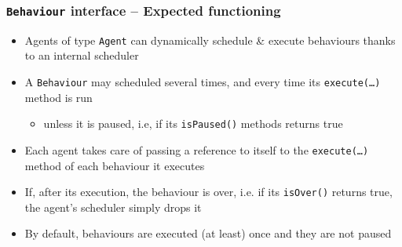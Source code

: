 \documentclass[presentation]{beamer}\mode<presentation>{\usetheme{AMSCesenaPurpleAndGold}}
\begin{document}
\begin{frame}%
    \frametitle{\texttt{Behaviour} interface -- Expected functioning}

    \begin{itemize}
        \item Agents of type \texttt{Agent} can dynamically \alert{schedule \& execute} behaviours thanks to an \alert{internal scheduler}

        \vfill

        \item A \texttt{Behaviour} may scheduled several times, and every time its \alert{\texttt{execute(\ldots)}} method is run
        \begin{itemize}
            \item unless it is \alert{paused}, i.e, if its \texttt{\alert{isPaused()}} methods returns true
        \end{itemize}

        \vfill

        \item Each agent takes care of passing a reference to itself to the \texttt{\alert{execute(\ldots)}} method of each behaviour it executes

        \vfill

        \item If, after its execution, the behaviour is over, i.e. if its \texttt{\alert{isOver()}} returns true, the agent's scheduler simply drops it

        \vfill

        \item By default, behaviours are executed (at least) once and they are not paused
    \end{itemize}

\end{frame}
\end{document}
